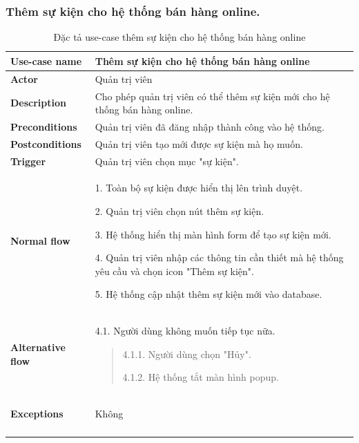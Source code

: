 \subsubsection{Thêm sự kiện cho hệ thống bán hàng online.}
{
    \setlength\extrarowheight{6pt}
    \begin{longtable}{| p{} | p{} |}
        \hline
        \textbf{Use-case name}
         &
        Thêm sự kiện cho hệ thống bán hàng online
        \\
        \hline
        \textbf{Actor}
         &
        Quản trị viên
        \\
        \hline
        \textbf{Description}
         &
        Cho phép quản trị viên có thể thêm sự kiện mới cho hệ thống bán hàng online.
        \\
        \hline
        \textbf{Preconditions}
         &
        Quản trị viên đã đăng nhập thành công vào hệ thống.
        \\
        \hline
        \textbf{Postconditions}
         &
        Quản trị viên tạo mới được sự kiện mà họ muốn.
        \\
        \hline
        \textbf{Trigger}
         &
        Quản trị viên chọn mục "sự kiện".
        \\
        \hline
        \begin{flushleft}
            \textbf{Normal flow}
        \end{flushleft}
         &
        1. Toàn bộ sự kiện được hiển thị lên trình duyệt.

        2. Quản trị viên chọn nút thêm sự kiện.

        3. Hệ thống hiển thị màn hình form để tạo sự kiện mới.

        4. Quản trị viên nhập các thông tin cần thiết mà hệ thống yêu cầu và chọn icon "Thêm sự kiện".

        5. Hệ thống cập nhật thêm sự kiện mới vào database.
        \\
        \hline
        \begin{flushleft}
            \textbf{Alternative flow}
        \end{flushleft}
         &
        4.1. Người dùng không muốn tiếp tục nữa.
        \begin{quote}
            4.1.1. Người dùng chọn "Hủy".

            4.1.2. Hệ thống tắt màn hình popup.
        \end{quote}
        \\
        \hline
        \begin{flushleft}
            \textbf{Exceptions}
        \end{flushleft}
         &
        Không
        \\
        \hline
        \caption{Đặc tả use-case thêm sự kiện cho hệ thống bán hàng online}
    \end{longtable}
}


